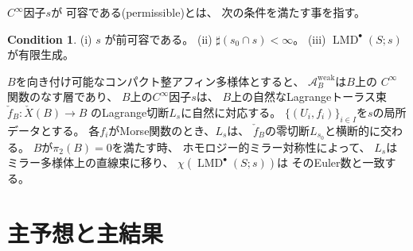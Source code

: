 \documentclass[uplatex,dvipdfmx,12pt]{jsarticle}
\numberwithin{equation}{section}
\theoremstyle{definition}
\newtheorem{condition}[theorem]{Condition}
\newcommand{\opn}[1]{\operatorname{#1}}
\begin{document}
$C^{\infty}$因子$s$が
可容である(permissible)とは、
次の条件を満たす事を指す。

\setcounter{section}{2}
\setcounter{condition}{38}
\begin{condition} \label{condition-good}
(i) $s$ が前可容である。
(ii) $\sharp (s_0\cap s)<\infty$。
(iii) $\opn{LMD}^{\bullet}(S;s)$ が有限生成。
\end{condition}

$B$を向き付け可能なコンパクト整アフィン多様体とすると、
$\mathcal{A}_B^{\mathrm{weak}}$は$B$上の
$C^{\infty}$関数のなす層であり、
$B$上の$C^{\infty}$因子$s$は、
$B$上の自然なLagrangeトーラス束
$\check{f}_B\colon \check{X}(B)\to B$
のLagrange切断$L_s$に自然に対応する。
$\{(U_i,f_i)\}_{i\in I}$を$s$の局所データとする。
各$f_i$がMorse関数のとき、$L_s$は、
$\check{f}_B$の零切断$L_{s_0}$と横断的に交わる。
$B$が$\pi_2(B) = 0$を満たす時、
ホモロジー的ミラー対称性\cite{MR1882331,MR4301560}によって、
$L_{s}$はミラー多様体上の直線束に移り、
$\chi(\opn{LMD}^{\bullet}(S;s))$は
そのEuler数と一致する。

\section{主予想と主結果}
\end{document}
